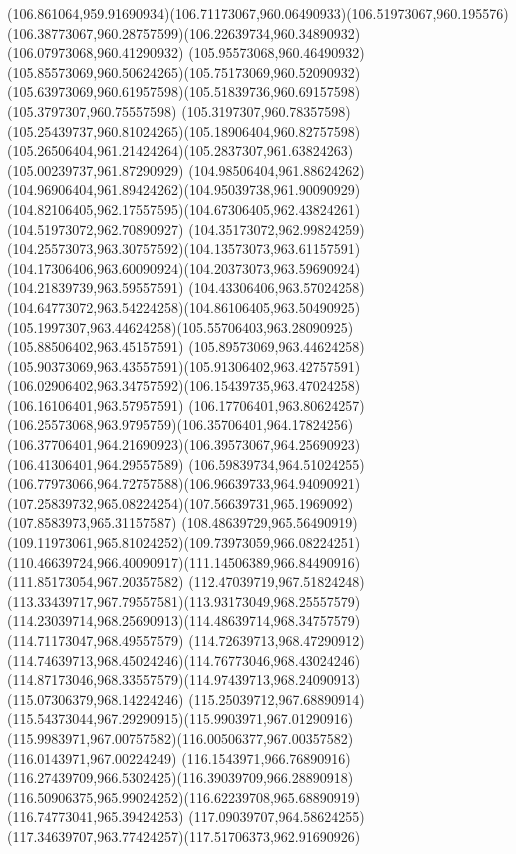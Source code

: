 {{		\curveto(106.861064,959.91690934)(106.71173067,960.06490933)(106.51973067,960.195576)
		\curveto(106.38773067,960.28757599)(106.22639734,960.34890932)(106.07973068,960.41290932)
		\curveto(105.95573068,960.46490932)(105.85573069,960.50624265)(105.75173069,960.52090932)
		\curveto(105.63973069,960.61957598)(105.51839736,960.69157598)(105.3797307,960.75557598)
		\curveto(105.3197307,960.78357598)(105.25439737,960.81024265)(105.18906404,960.82757598)
		\curveto(105.26506404,961.21424264)(105.2837307,961.63824263)(105.00239737,961.87290929)
		\curveto(104.98506404,961.88624262)(104.96906404,961.89424262)(104.95039738,961.90090929)
		\curveto(104.82106405,962.17557595)(104.67306405,962.43824261)(104.51973072,962.70890927)
		\curveto(104.35173072,962.99824259)(104.25573073,963.30757592)(104.13573073,963.61157591)
		\curveto(104.17306406,963.60090924)(104.20373073,963.59690924)(104.21839739,963.59557591)
		\curveto(104.43306406,963.57024258)(104.64773072,963.54224258)(104.86106405,963.50490925)
		\curveto(105.1997307,963.44624258)(105.55706403,963.28090925)(105.88506402,963.45157591)
		\curveto(105.89573069,963.44624258)(105.90373069,963.43557591)(105.91306402,963.42757591)
		\curveto(106.02906402,963.34757592)(106.15439735,963.47024258)(106.16106401,963.57957591)
		\curveto(106.17706401,963.80624257)(106.25573068,963.9795759)(106.35706401,964.17824256)
		\curveto(106.37706401,964.21690923)(106.39573067,964.25690923)(106.41306401,964.29557589)
		\curveto(106.59839734,964.51024255)(106.77973066,964.72757588)(106.96639733,964.94090921)
		\curveto(107.25839732,965.08224254)(107.56639731,965.1969092)(107.8583973,965.31157587)
		\curveto(108.48639729,965.56490919)(109.11973061,965.81024252)(109.73973059,966.08224251)
		\curveto(110.46639724,966.40090917)(111.14506389,966.84490916)(111.85173054,967.20357582)
		\curveto(112.47039719,967.51824248)(113.33439717,967.79557581)(113.93173049,968.25557579)
		\curveto(114.23039714,968.25690913)(114.48639714,968.34757579)(114.71173047,968.49557579)
		\curveto(114.72639713,968.47290912)(114.74639713,968.45024246)(114.76773046,968.43024246)
		\curveto(114.87173046,968.33557579)(114.97439713,968.24090913)(115.07306379,968.14224246)
		\curveto(115.25039712,967.68890914)(115.54373044,967.29290915)(115.9903971,967.01290916)
		\curveto(115.9983971,967.00757582)(116.00506377,967.00357582)(116.0143971,967.00224249)
		\curveto(116.1543971,966.76890916)(116.27439709,966.5302425)(116.39039709,966.28890918)
		\curveto(116.50906375,965.99024252)(116.62239708,965.68890919)(116.74773041,965.39424253)
		\curveto(117.09039707,964.58624255)(117.34639707,963.77424257)(117.51706373,962.91690926)
}}
